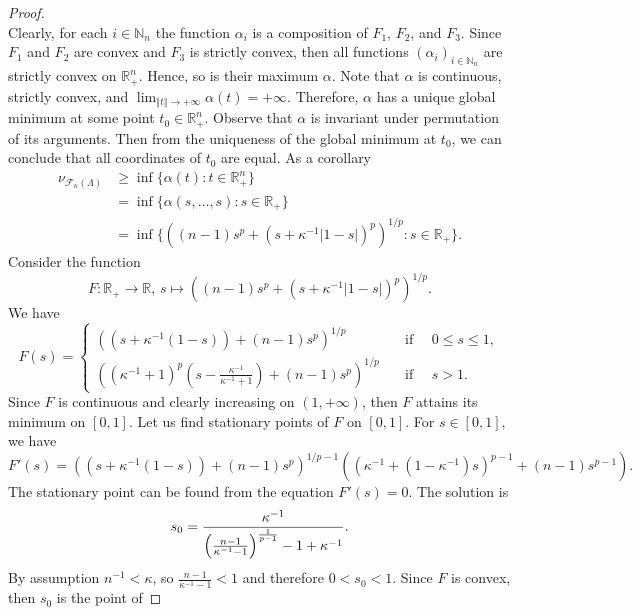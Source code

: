 \documentclass[12pt]{article}
\begin{document}
\begin{proof}
\[    \]
    Clearly, for each $i\in\mathbb{N}_n$ the function $\alpha_i$ is a 
    composition of $F_1$, $F_2$, and $F_3$. Since $F_1$ and $F_2$ are convex 
    and $F_3$ is strictly convex, then all 
    functions $(\alpha_i)_{i\in\mathbb{N}_n}$ are strictly convex 
    on $\mathbb{R}_+^n$. Hence, so is their maximum $\alpha$. Note 
    that $\alpha$ is continuous, strictly convex, 
    and $\lim_{\Vert t\Vert\to+\infty}\alpha(t)=+\infty$. Therefore, $\alpha$ 
    has a unique global minimum at some point $t_0\in\mathbb{R}_+^n$. Observe 
    that $\alpha$ is invariant under permutation of its arguments. Then from 
    the uniqueness of the global minimum at $t_0$, we can conclude that all 
    coordinates of $t_0$ are equal. As a corollary
    \[
    \begin{aligned}
        \nu_{\mathcal{F}_{\kappa}(\Lambda)}
        &\geq\inf\{\alpha(t) : t\in\mathbb{R}_+^n\} \\
        &=\inf\{\alpha(s,\ldots,s) : s\in\mathbb{R}_+\} \\
        &=\inf\{((n-1)s^p+(s+\kappa^{-1}|1-s|)^p)^{1/p} : s\in\mathbb{R}_+\}.
    \end{aligned}
    \]
    Consider the function
    \[
        F:\mathbb{R}_+\to\mathbb{R},\,
        s\mapsto ((n-1)s^p+(s+\kappa^{-1}|1-s|)^p)^{1/p}.
    \]
    We have 
    \[
        F(s)=
        \begin{cases}
            ((s+\kappa^{-1}(1-s))+(n-1)s^p)^{1/p}
            \quad&\text{if }\quad 0\leq s\leq 1, \\
            \left(
                (\kappa^{-1}+1)^p
                \left(s-\frac{\kappa^{-1}}{\kappa^{-1}+1}\right)+
                (n-1)s^p
            \right)^{1/p}
            \quad&\text{if }\quad s>1.
        \end{cases}
    \]
    Since $F$ is continuous and clearly increasing on $(1,+\infty)$, then $F$ 
    attains its minimum on $[0, 1]$. Let us find stationary points 
    of $F$ on $[0, 1]$. For $s\in[0,1]$, we have
    \[
        F'(s)=
        ((s+\kappa^{-1}(1-s))+(n-1)s^p)^{1/p-1}
        ((\kappa^{-1}+(1-\kappa^{-1})s)^{p-1}+(n-1)s^{p-1}).
    \]
    The stationary point can be found from the equation $F'(s)=0$. 
    The solution is
    \[
        s_0
        =\frac{
            \kappa^{-1}
        }{
            \left(
                \frac{n-1}{\kappa^{-1}-1}
            \right)^{\frac{1}{p-1}}
            -1+\kappa^{-1}
        }.\\
    \]
    By assumption $n^{-1}<\kappa$, so $\frac{n-1}{\kappa^{-1}-1}<1$ and 
    therefore $0<s_0<1$. Since $F$ is convex, then $s_0$ is the point of 

\end{proof}
\end{document}
